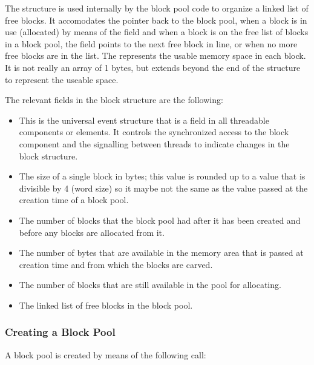 The  structure is used internally by the block pool code to
organize a linked list of free blocks. It accomodates the pointer back to
the block pool, when a block is in use (allocated) by means of the
 field and when a block is on the
free list of blocks in a block pool, the field
 points to the next free block in
line, or  when no more free blocks are in the list. The
 represents the usable memory space in
each block. It is not really an array of 1 bytes, but extends beyond the end
of the structure to represent the useable space.

The relevant fields in the block structure are the following:

\begin{itemize}
\item {} This is the universal event structure that is a field
in all threadable components or elements. It controls the synchronized access
to the block component and the signalling between threads to indicate changes
in the block structure.
\item {} The size of a single block in
bytes; this value is rounded up to a value that is divisible by 4 (word
size) so it maybe not the same as the value passed at the creation time of a
block pool.
\item {} The number of blocks that the
block pool had after it has been created and before any blocks are allocated
from it.
\item {} The number of bytes that are
available in the memory area that is passed at creation time and from which
the blocks are carved.
\item {} The number of blocks that
are still available in the pool for allocating.
\item {} The linked list of free blocks in
the block pool.
\end{itemize}

\subsubsection{Creating a Block Pool}

A block pool is created by means of the following call:


